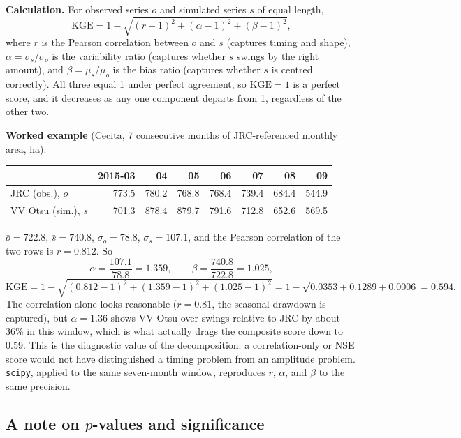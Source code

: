 \documentclass[12pt,authoryear]{elsarticle}
\begin{document}
\textbf{Calculation.} For observed series $o$ and simulated series $s$ of
equal length,
\[
\mathrm{KGE} = 1 - \sqrt{(r-1)^2 + (\alpha-1)^2 + (\beta-1)^2},
\]
where $r$ is the Pearson correlation between $o$ and $s$ (captures timing
and shape), $\alpha = \sigma_s/\sigma_o$ is the variability ratio (captures
whether $s$ swings by the right amount), and $\beta = \mu_s/\mu_o$ is the
bias ratio (captures whether $s$ is centred correctly). All three equal 1
under perfect agreement, so $\mathrm{KGE}=1$ is a perfect score, and it
decreases as any one component departs from 1, regardless of the other two.

\textbf{Worked example} (Cecita, 7 consecutive months of JRC-referenced
monthly area, ha):

\begin{center}
\begin{tabular}{lrrrrrrr}
\toprule
& 2015-03 & 04 & 05 & 06 & 07 & 08 & 09 \\
\midrule
JRC (obs.), $o$    & 773.5 & 780.2 & 768.8 & 768.4 & 739.4 & 684.4 & 544.9 \\
VV Otsu (sim.), $s$ & 701.3 & 878.4 & 879.7 & 791.6 & 712.8 & 652.6 & 569.5 \\
\bottomrule
\end{tabular}
\end{center}

$\bar{o}=722.8$, $\bar{s}=740.8$, $\sigma_o=78.8$, $\sigma_s=107.1$, and the
Pearson correlation of the two rows is $r=0.812$. So
\[
\alpha = \frac{107.1}{78.8} = 1.359, \qquad
\beta = \frac{740.8}{722.8} = 1.025,
\]
\[
\mathrm{KGE} = 1 - \sqrt{(0.812-1)^2 + (1.359-1)^2 + (1.025-1)^2}
             = 1 - \sqrt{0.0353 + 0.1289 + 0.0006} = 0.594.
\]
The correlation alone looks reasonable ($r=0.81$, the seasonal drawdown is
captured), but $\alpha=1.36$ shows VV Otsu over-swings relative to JRC by
about 36\% in this window, which is what actually drags the composite score
down to 0.59. This is the diagnostic value of the decomposition: a
correlation-only or NSE score would not have distinguished a timing problem
from an amplitude problem. \texttt{scipy}, applied to the same seven-month
window, reproduces $r$, $\alpha$, and $\beta$ to the same precision.

\subsection*{A note on $p$-values and significance}
\end{document}
